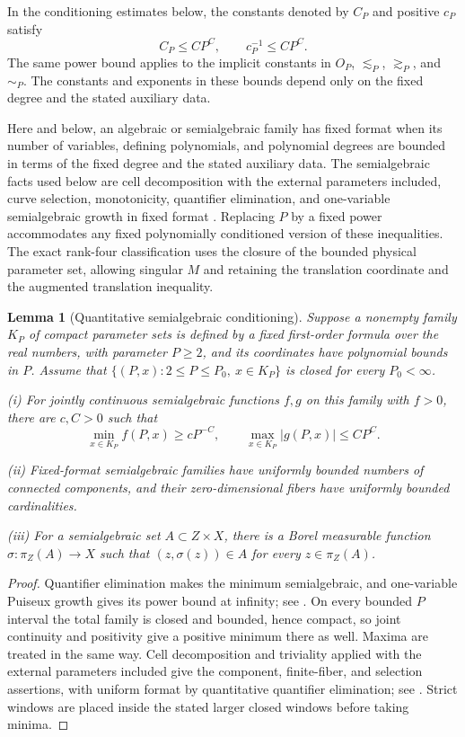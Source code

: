 \documentclass[11pt]{amsart}
\newtheorem{lemma}[theorem]{Lemma}
\theoremstyle{definition}
\theoremstyle{remark}
\numberwithin{equation}{section}
\begin{document}
In the conditioning estimates below, the constants denoted by $C_P$ and positive $c_P$ satisfy
\[
C_P\le CP^C,\qquad c_P^{-1}\le CP^C.
\]
The same power bound applies to the implicit constants in $O_P$, $\lesssim_P$, $\gtrsim_P$, and $\sim_P$. The constants and exponents in these bounds depend only on the fixed degree and the stated auxiliary data.

Here and below, an algebraic or semialgebraic family has fixed format when its number of variables, defining polynomials, and polynomial degrees are bounded in terms of the fixed degree and the stated auxiliary data. The semialgebraic facts used below are cell decomposition with the external parameters included, curve selection, monotonicity, quantifier elimination, and one-variable semialgebraic growth in fixed format \cite{BPR}. Replacing $P$ by a fixed power accommodates any fixed polynomially conditioned version of these inequalities. The exact rank-four classification uses the closure of the bounded physical parameter set, allowing singular $M$ and retaining the translation coordinate and the augmented translation inequality.

\begin{lemma}[Quantitative semialgebraic conditioning]\label{geo:conditioning}
Suppose a nonempty family $K_P$ of compact parameter sets is defined by a fixed first-order formula over the real numbers, with parameter $P\ge2$, and its coordinates have polynomial bounds in $P$. Assume that $\{(P,x):2\le P\le P_0,\ x\in K_P\}$ is closed for every $P_0<\infty$.

\noindent\textup{(i)} For jointly continuous semialgebraic functions $f,g$ on this family with $f>0$, there are $c,C>0$ such that
\[
\min_{x\in K_P}f(P,x)\ge cP^{-C},\qquad \max_{x\in K_P}|g(P,x)|\le CP^C.
\]

\noindent\textup{(ii)} Fixed-format semialgebraic families have uniformly bounded numbers of connected components, and their zero-dimensional fibers have uniformly bounded cardinalities.

\noindent\textup{(iii)} For a semialgebraic set $A\subset Z\times X$, there is a Borel measurable function $\sigma:\pi_Z(A)\to X$ such that $(z,\sigma(z))\in A$ for every $z\in\pi_Z(A)$.
\end{lemma}
\begin{proof}
Quantifier elimination makes the minimum semialgebraic, and one-variable Puiseux growth gives its power bound at infinity; see \cite[Theorems 2.77 and 3.14]{BPR}. On every bounded $P$ interval the total family is closed and bounded, hence compact, so joint continuity and positivity give a positive minimum there as well. Maxima are treated in the same way. Cell decomposition and triviality applied with the external parameters included give the component, finite-fiber, and selection assertions, with uniform format by quantitative quantifier elimination; see \cite[Theorems 5.6, 5.46, and 14.16]{BPR}. Strict windows are placed inside the stated larger closed windows before taking minima.
\end{proof}
\end{document}

